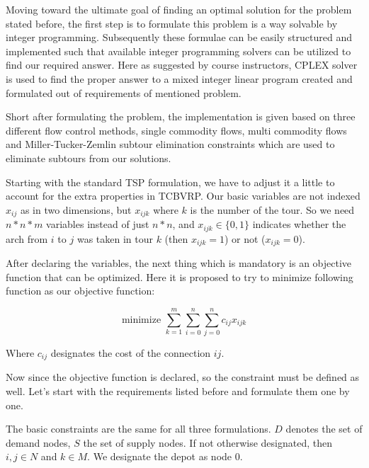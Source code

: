 Moving toward the ultimate goal of finding an optimal solution for the problem
stated before, the first step is to formulate this problem is a way solvable by
integer programming. Subsequently these formulae can be easily structured and
implemented such that available integer programming solvers can be utilized to
find our required answer. Here as suggested by course instructors, CPLEX solver
is used to find the proper answer to a mixed integer linear program created and
formulated out of requirements of mentioned problem.

Short after formulating the problem, the implementation is given based on three
different flow control methods, single commodity flows, multi commodity flows
and Miller-Tucker-Zemlin subtour elimination constraints which are used to
eliminate subtours from our solutions.

Starting with the standard TSP formulation, we have to adjust it a little to 
account for the extra properties in TCBVRP. Our basic variables are not
indexed $x_{ij}$ as in two dimensions, but $x_{ijk}$ where $k$ is the number
of the tour. So we need $n*n*m$ variables instead of just $n*n$, and $x_{ijk} \in \{0,1\}$
indicates whether the arch from $i$ to $j$ was taken in tour $k$ (then $x_{ijk} = 1$) or
not ($x_{ijk} = 0$).

After declaring the variables, the next thing which is mandatory is an objective function 
that can be optimized. Here it is proposed to try to minimize following function as our
objective function:

\begin{equation}
\mbox{minimize }\sum_{k = 1}^{m} \sum_{i = 0}^{n} \sum_{j = 0}^{n} c_{ij} x_{ijk}
\end{equation}

Where $c_{ij}$ designates the cost of the connection $ij$.

Now since the objective function is declared, so the constraint must be defined
as well. Let's start with the requirements listed before and formulate them one
by one.

The basic constraints are the same for all three formulations. $D$ denotes the
set of demand nodes, $S$ the set of supply nodes. If not otherwise designated,
then $i, j \in N$ and $k \in M$. We designate the depot as node $0$.

